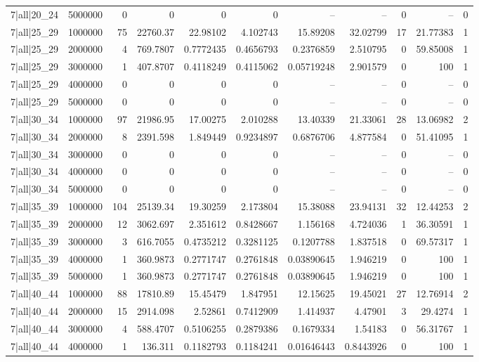 \begin{tabular}{lrrrrrrrrrr}
7|all|20\_24 & 5000000 & 0 & 0 & 0 & 0 & -- & -- & 0 & -- & 0 \\
7|all|25\_29 & 1000000 & 75 & 22760.37 & 22.98102 & 4.102743 & 15.89208 & 32.02799 & 17 & 21.77383 & 1 \\
7|all|25\_29 & 2000000 & 4 & 769.7807 & 0.7772435 & 0.4656793 & 0.2376859 & 2.510795 & 0 & 59.85008 & 1 \\
7|all|25\_29 & 3000000 & 1 & 407.8707 & 0.4118249 & 0.4115062 & 0.05719248 & 2.901579 & 0 & 100 & 1 \\
7|all|25\_29 & 4000000 & 0 & 0 & 0 & 0 & -- & -- & 0 & -- & 0 \\
7|all|25\_29 & 5000000 & 0 & 0 & 0 & 0 & -- & -- & 0 & -- & 0 \\
7|all|30\_34 & 1000000 & 97 & 21986.95 & 17.00275 & 2.010288 & 13.40339 & 21.33061 & 28 & 13.06982 & 2 \\
7|all|30\_34 & 2000000 & 8 & 2391.598 & 1.849449 & 0.9234897 & 0.6876706 & 4.877584 & 0 & 51.41095 & 1 \\
7|all|30\_34 & 3000000 & 0 & 0 & 0 & 0 & -- & -- & 0 & -- & 0 \\
7|all|30\_34 & 4000000 & 0 & 0 & 0 & 0 & -- & -- & 0 & -- & 0 \\
7|all|30\_34 & 5000000 & 0 & 0 & 0 & 0 & -- & -- & 0 & -- & 0 \\
7|all|35\_39 & 1000000 & 104 & 25139.34 & 19.30259 & 2.173804 & 15.38088 & 23.94131 & 32 & 12.44253 & 2 \\
7|all|35\_39 & 2000000 & 12 & 3062.697 & 2.351612 & 0.8428667 & 1.156168 & 4.724036 & 1 & 36.30591 & 1 \\
7|all|35\_39 & 3000000 & 3 & 616.7055 & 0.4735212 & 0.3281125 & 0.1207788 & 1.837518 & 0 & 69.57317 & 1 \\
7|all|35\_39 & 4000000 & 1 & 360.9873 & 0.2771747 & 0.2761848 & 0.03890645 & 1.946219 & 0 & 100 & 1 \\
7|all|35\_39 & 5000000 & 1 & 360.9873 & 0.2771747 & 0.2761848 & 0.03890645 & 1.946219 & 0 & 100 & 1 \\
7|all|40\_44 & 1000000 & 88 & 17810.89 & 15.45479 & 1.847951 & 12.15625 & 19.45021 & 27 & 12.76914 & 2 \\
7|all|40\_44 & 2000000 & 15 & 2914.098 & 2.52861 & 0.7412909 & 1.414937 & 4.47901 & 3 & 29.4274 & 1 \\
7|all|40\_44 & 3000000 & 4 & 588.4707 & 0.5106255 & 0.2879386 & 0.1679334 & 1.54183 & 0 & 56.31767 & 1 \\
7|all|40\_44 & 4000000 & 1 & 136.311 & 0.1182793 & 0.1184241 & 0.01646443 & 0.8443926 & 0 & 100 & 1 \\

\end{tabular}
